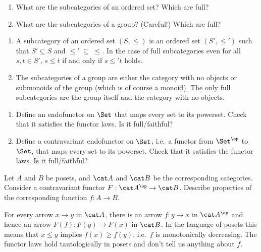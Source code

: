\begin{exercise}
  \begin{enumerate}
    \item What are the subcategories of an ordered set? Which are full?
    \item What are the subcategories of a group? (Careful!)
      Which are full?
  \end{enumerate}
\end{exercise}

\begin{answer}
  \begin{enumerate}
  \item A subcategory of an ordered set $(S,\leq)$ is an ordered set $(S',\leq')$ such that $S'\subseteq S$ and $\leq'\;\subseteq\;\leq$. In the case of full subcategories even for all $s,t\in S'$, $s\leq t$ if and only if $s\leq' t$ holds.
  \item The subcategories of a group are either the category with no objects or submonoids of the group (which is of course a monoid). The only full subcategories are the group itself and the category with no objects.
  \end{enumerate}
\end{answer}

\begin{exercise}
  \begin{enumerate}
    \item Define an endofunctor on $\Set$ that maps every set to its powerset.
      Check that it satisfies the functor laws.
      Is it full/faithful?
    \item Define a contravariant endofunctor on $\Set$, i.e.\ a functor from $\Set^\op$ to $\Set$, that maps every set to its powerset.
      Check that it satisfies the functor laws.
      Is it full/faithful?
  \end{enumerate}
\end{exercise}

\begin{exercise}
  Let $A$ and $B$ be posets, and $\A$ and $\B$ be the corresponding categories. Consider a contravariant functor $F:\A^{\op}\rightarrow \B$. Describe properties of the corresponding function $f:A\rightarrow B$.
\end{exercise}

\begin{answer}
  For every arrow $x \to y$ in $\A$, there is an arrow $f : y \to x$ in $\A^\op$ and hence an arrow $F(f) : F(y) \to F(x)$ in $\B$.
  In the language of posets this means that $x \leq y$ implies $f(x) \geq f(y)$, i.e.\ $f$ is monotonically decreasing.
  The functor laws hold tautologically in posets and don't tell us anything about $f$.
\end{answer}


